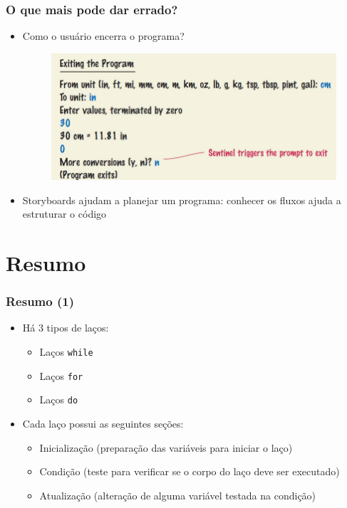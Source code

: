 \documentclass[xcolor={dvipsnames,table},aspectratio=169]{beamer}
\begin{document}
\begin{frame}\frametitle{O que mais pode dar errado?}
\begin{itemize}
	\item Como o usuário encerra o programa?
\begin{figure}[h]
	\includegraphics[height=0.5\paperheight,center]{pucrs-ep-fprog-unidade_04-lacos-laminas-storyboards3.jpg}
\end{figure}
	\item Storyboards ajudam a planejar um programa: conhecer os fluxos ajuda a estruturar o código
\end{itemize}
\end{frame}

\section{Resumo}

\begin{frame}\frametitle{Resumo (1)}
\begin{itemize}
	\item Há 3 tipos de laços:
	\begin{itemize}
		\item Laços \texttt{while}
		\item Laços \texttt{for}
		\item Laços \texttt{do}
	\end{itemize}
	\item Cada laço possui as seguintes seções:
	\begin{itemize}
		\item Inicialização (preparação das variáveis para iniciar o laço)
		\item Condição (teste para verificar se o corpo do laço deve ser executado)
		\item Atualização (alteração de alguma variável testada na condição)
	\end{itemize}
\end{itemize}
\end{frame}
\end{document}
